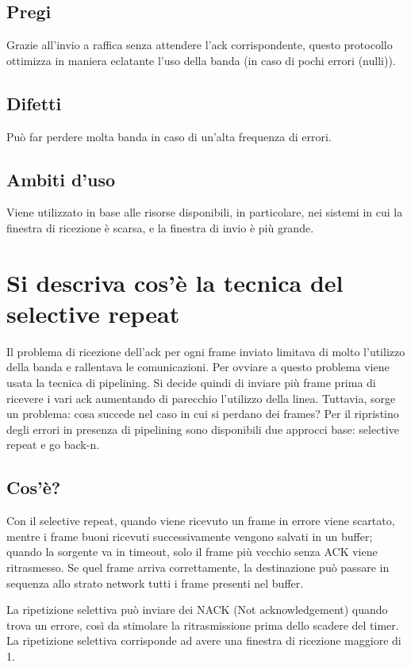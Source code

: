 \subsection{Pregi}
Grazie all'invio a raffica senza attendere l'ack corrispondente, questo protocollo ottimizza in maniera eclatante l'uso della banda (in caso di pochi errori (nulli)).

\subsection{Difetti}
Può far perdere molta banda in caso di un'alta frequenza di errori.

\subsection{Ambiti d'uso}
Viene utilizzato in base alle risorse disponibili, in particolare, nei sistemi in cui la finestra di ricezione è scarsa, e la finestra di invio è più grande.

\section{Si descriva cos'è la tecnica del selective repeat}

Il problema di ricezione dell'ack per ogni frame inviato limitava di molto l'utilizzo della banda e rallentava le comunicazioni.
Per ovviare a questo problema viene usata la tecnica di pipelining.
Si decide quindi di inviare più frame prima di ricevere i vari ack aumentando di parecchio l'utilizzo della linea.
Tuttavia, sorge un problema: cosa succede nel caso in cui si perdano dei frames?
Per il ripristino degli errori in presenza di pipelining sono disponibili due approcci base: selective repeat e go back-n.
\subsection{Cos'è?}
Con il selective repeat, quando viene ricevuto un frame in errore viene scartato, mentre i frame buoni ricevuti successivamente vengono salvati in un buffer;
quando la sorgente va in timeout, solo il frame più vecchio senza ACK viene ritrasmesso.
Se quel frame arriva correttamente, la destinazione può passare in sequenza allo strato network tutti i frame presenti nel buffer.

La ripetizione selettiva può inviare dei NACK (Not acknowledgement) quando trova un errore, così da stimolare la ritrasmissione prima dello scadere del timer.
La ripetizione selettiva corrisponde ad avere una finestra di ricezione maggiore di 1.

